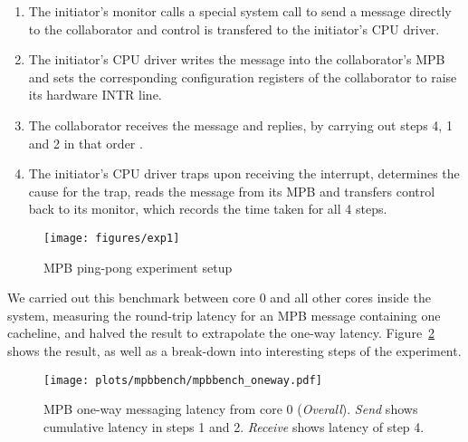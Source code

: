 \documentclass[a4paper,twoside]{report} %
\begin{document}
\begin{enumerate}
\item The initiator's monitor calls a special system call to send a
  message directly to the collaborator and control is transfered to the
  initiator's CPU driver.

\item The initiator's CPU driver writes the message into the collaborator's
  MPB and sets the corresponding configuration registers of the collaborator
  to raise its hardware INTR line.

\item The collaborator receives the message and replies, by carrying out
  steps 4, 1 and 2 in that order .

\item The initiator's CPU driver traps upon receiving the interrupt,
  determines the cause for the trap, reads the message from its MPB
  and transfers control back to its monitor, which records the time
  taken for all 4 steps.
\end{enumerate}

\begin{figure}
  \centering
  \texttt{[image: figures/exp1]}
  \caption{MPB ping-pong experiment setup}
  \label{fig:mpbbench}
\end{figure}


We carried out this benchmark between core 0 and all other cores
inside the system, measuring the round-trip latency for an MPB
message containing one cacheline, and halved the result to extrapolate
the one-way latency. Figure~\ref{fig:mpbresults1} shows the result, as
well as a break-down into interesting steps of the experiment.

\begin{figure}
  \centering
  \texttt{[image: plots/mpbbench/mpbbench\_oneway.pdf]}
  \caption{MPB one-way messaging latency from core 0
    (\emph{Overall}). \emph{Send} shows cumulative latency in steps 1
    and 2. \emph{Receive} shows latency of step 4.}
  \label{fig:mpbresults1}
\end{figure}


\end{document}
